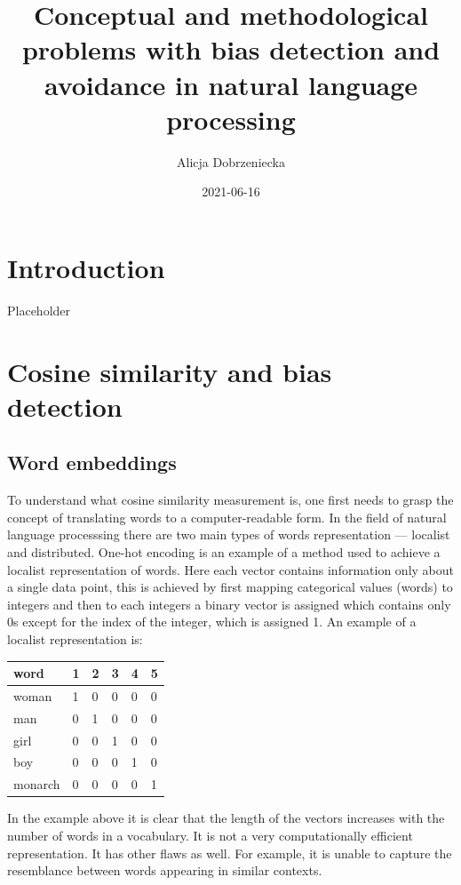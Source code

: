 \documentclass[
  12pt,
]{book}
\title{Conceptual and methodological problems with bias detection and avoidance in natural language processing}
\author{Alicja Dobrzeniecka}
\date{2021-06-16}
\begin{document}
\maketitle

{
\setcounter{tocdepth}{5}
\tableofcontents
}
\hypertarget{introduction}{%
\chapter{Introduction}\label{introduction}}

Placeholder

\hypertarget{cosine-similarity-and-bias-detection}{%
\chapter{Cosine similarity and bias detection}\label{cosine-similarity-and-bias-detection}}

\hypertarget{word-embeddings}{%
\section{Word embeddings}\label{word-embeddings}}

To understand what cosine similarity measurement is, one first needs to grasp the concept of translating words to a computer-readable form. In the field of natural language processsing there are two main types of words representation --- localist and distributed. One-hot encoding is an example of a method used to achieve a localist representation of words. Here each vector contains information only about a single data point, this is achieved by first mapping categorical values (words) to integers and then to each integers a binary vector is assigned which contains only 0s except for the index of the integer, which is assigned 1. An example of a localist representation is:

\begin{longtable}[]{@{}llllll@{}}
\toprule
word & 1 & 2 & 3 & 4 & 5 \\
\midrule
\endhead
woman & 1 & 0 & 0 & 0 & 0 \\
man & 0 & 1 & 0 & 0 & 0 \\
girl & 0 & 0 & 1 & 0 & 0 \\
boy & 0 & 0 & 0 & 1 & 0 \\
monarch & 0 & 0 & 0 & 0 & 1 \\
\bottomrule
\end{longtable}

In the example above it is clear that the length of the vectors increases with the number of words in a vocabulary. It is not a very computationally efficient representation. It has other flaws as well. For example, it is unable to capture the resemblance between words appearing in similar contexts.
\end{document}
